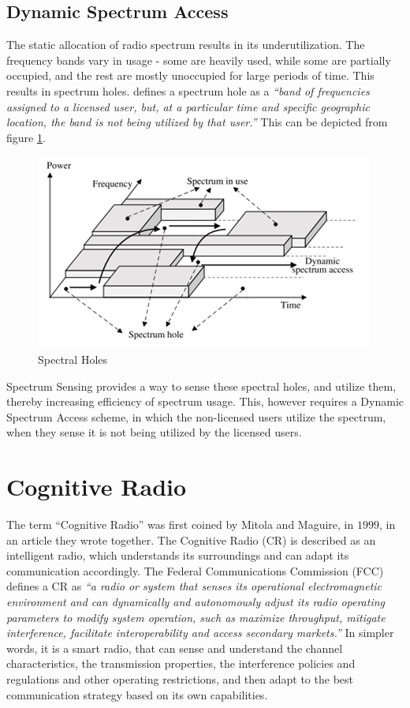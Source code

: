 \subsection{Dynamic Spectrum Access}
The static allocation of radio spectrum results in its underutilization. The
frequency bands vary in usage - some are heavily used, while some are partially
occupied, and the rest are mostly unoccupied for large periods of
time\cite{haykin}. This results in spectrum holes. \cite{kolodzy} defines a spectrum
hole as a \textit{``band of frequencies assigned to a licensed user, but, at a particular time and
specific geographic location, the band is not being utilized by that
user.''} This can be depicted from figure \ref{fig:specholes}. 
\begin{figure}[h]
\centering
\includegraphics[keepaspectratio,scale=0.8]{images/spectral_holes.PNG}
\caption{Spectral Holes\cite{moghaddam}}
\label{fig:specholes}
\end{figure}
Spectrum Sensing provides a way to sense these spectral holes, and utilize them,
thereby increasing efficiency of spectrum usage. This, however requires a Dynamic Spectrum Access scheme, in which the non-licensed users
utilize the spectrum, when they sense it is not being utilized by the licensed
users.


\section{Cognitive Radio}
The term ``Cognitive Radio'' was first coined by Mitola and Maguire, in $1999$,
in an article they wrote together\cite{mitola}. The Cognitive Radio (CR) is
described as an intelligent radio, which understands its surroundings and can adapt its
communication accordingly. The Federal Communications Commission (FCC) defines a
CR as \textit{``a radio or system that senses its operational electromagnetic
environment and can dynamically and autonomously adjust its radio operating
parameters to modify system operation, such as maximize throughput, mitigate
interference, facilitate interoperability and access secondary
markets.''}\cite{fcc2} In simpler words, it is a smart radio, that can sense and
understand the channel characteristics, the transmission properties, the interference policies and
regulations and other operating restrictions, and then adapt to the best
communication strategy based on its own capabilities.

